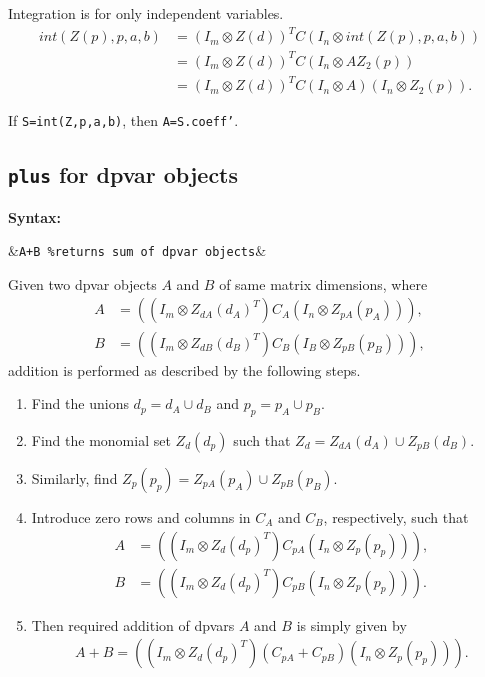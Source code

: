 \documentclass{article}
\begin{document}
	Integration is for only independent variables.
	\begin{align*}
		int(Z(p),p,a,b) &= (I_m \otimes  Z(d))^T C (I_n \otimes int(Z(p),p,a,b))  \\
		&= (I_m \otimes  Z(d))^T C (I_n \otimes A Z_2(p))\\
		&= (I_m \otimes  Z(d))^T C (I_n \otimes A)(I_n \otimes Z_2(p)).
	\end{align*}
	
	If \texttt{S=int(Z,p,a,b)}, then \texttt{A=S.coeff'}.
	
	\subsection{\texttt{plus} for dpvar objects}

	\textbf{Syntax:}
		\begin{flalign*}
			&\texttt{A+B \%returns sum of dpvar objects}&
		\end{flalign*}


	Given two dpvar objects $A$ and $B$ of same matrix dimensions, where
	\begin{align*}
		A &= \left((I_m \otimes  Z_{dA}(d_A)^T) C_A (I_n \otimes Z_{pA}(p_A))\right),\\
		B &= \left((I_m \otimes  Z_{dB}(d_B)^T) C_B (I_B \otimes Z_{pB}(p_B))\right),
	\end{align*}
	addition is performed as described by the following steps.
	
	\begin{enumerate}
		\item Find the unions $d_p = d_A\cup d_B$ and $p_p = p_A \cup p_B$.
		\item Find the monomial set $Z_d(d_p)$ such that $Z_d = Z_{dA}(d_A)\cup Z_{pB}(d_B)$.
		\item Similarly, find $Z_p(p_p) = Z_{pA}(p_A)\cup Z_{pB}(p_B)$.
		\item Introduce zero rows and columns in $C_A$ and $C_B$, respectively, such that
		\begin{align*}
			A &= \left((I_m \otimes  Z_{d}(d_p)^T) C_{pA} (I_n \otimes Z_{p}(p_p))\right),\\
			B &= \left((I_m \otimes  Z_{d}(d_p)^T) C_{pB} (I_n \otimes Z_{p}(p_p))\right).
		\end{align*}
		\item Then required addition of dpvars $A$ and $B$ is simply given by
		\begin{align*}
			A+B = \left((I_m \otimes  Z_{d}(d_p)^T) (C_{pA}+C_{pB}) (I_n \otimes Z_{p}(p_p))\right).
		\end{align*}
	\end{enumerate}
	
\end{document}
